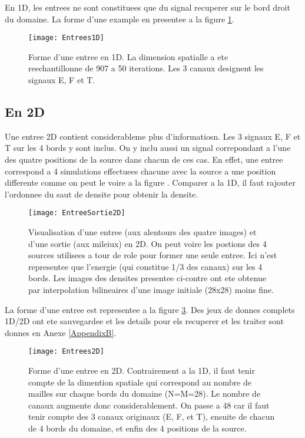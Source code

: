 En 1D, les entrees ne sont constituees que du signal recuperer sur le bord droit du domaine. La forme d'une example en presentee a la figure \ref{fig:Entrees1D}.

\begin{figure}[!h]
\centering
\texttt{[image: Entrees1D]} 
\decoRule
\caption[Entrees1D]{Forme d'une entree en 1D. La dimension spatialle a ete reechantillonne de 907 a 50 iterations. Les 3 canaux designent les signaux E, F et T.}
\label{fig:Entrees1D}
\end{figure}

\subsection{En 2D}
Une entree 2D contient considerableme plus d'informatiosn. Les 3 signaux E, F et T sur les 4 bords y sont inclus. On y inclu aussi un signal correpondant a l'une des quatre positions de la source dans chacun de ces cas. En effet, une entree correspond a 4 simulations effectuees chacune avec la source a une position differente comme on peut le voire a la figure . Comparer a la 1D, il faut rajouter l'ordonnee du saut de densite pour obtenir la densite.

\begin{figure}[!h]
\centering
\texttt{[image: EntreeSortie2D]} 
\decoRule
\caption[EntreeSortie2D]{Visualisation d'une entree (aux alentours des quatre images) et d'une sortie (aux mileiux) en 2D. On peut voire les postions des 4 sources utilisees a tour de role pour former une seule entree. Ici n'est representee que l'energie (qui constitue 1/3 des canaux) sur les 4 bords. Les images des densites presentee ci-contre ont ete obtenue par interpolation bilineaires d'une image initiale (28x28) moins fine.}
\label{fig:EntreeSortie2D}
\end{figure}


La forme d'une entree est representee a la figure \ref{fig:Entrees2D}. Des jeux de donnes complets 1D/2D ont ete sauvegardee et les details pour els recuperer et les traiter sont donnes en Anexe \ref{AppendixB}.

\begin{figure}[!h]
\centering
\texttt{[image: Entrees2D]} 
\decoRule
\caption[Entrees2D]{Forme d'une entree en 2D. Contrairement a la 1D, il faut tenir compte de la dimention spatiale qui correspond au nombre de mailles sur chaque bords du domaine (N=M=28). Le nombre de canaux augmente donc considerablement. On passe a 48 car il faut tenir compte des 3 canaux originaux (E, F, et T), ensuite de chacun de 4 bords du domaine, et enfin des 4 positions de la source.}
\label{fig:Entrees2D}
\end{figure}

